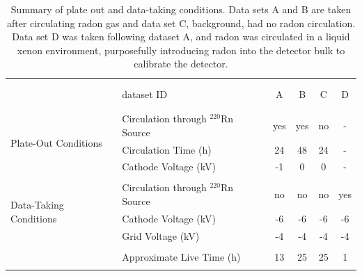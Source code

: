 \begin{table}[ht]
\centering
\begin{tabular}{llcccc}
\hline
\\[-5pt]
\\[-5pt]
& dataset ID & A &B & C & D \\
\\[-5pt]
\hline
\\[-5pt]

\multirow{3}{*}{Plate-Out Conditions} & Circulation through $^{220}$Rn Source & yes & yes & no & - \\
& Circulation Time (h) & 24 & 48 & 24 & - \\
& Cathode Voltage (kV) & -1 & 0 & 0 &  - \\
\\[-5pt]

\multirow{3}{*}{Data-Taking Conditions} & Circulation through $^{220}$Rn Source & no & no & no & yes\\
& Cathode Voltage (kV) & -6 & -6 & -6 & -6 \\
& Grid Voltage (kV) & -4 & -4 & -4 & -4 \\

\\[-5pt]
& Approximate Live Time (h) & 13 & 25 & 25 & 1\\


\\[-5pt]
\hline
\end{tabular}
\caption{Summary of plate out and data-taking conditions. Data sets A and B are taken after circulating radon gas and data set C, background, had no radon circulation. Data set D was taken following dataset A, and radon was circulated in a liquid xenon environment, purposefully introducing radon into the detector bulk to calibrate the detector.}
\label{T:1}
\end{table}


